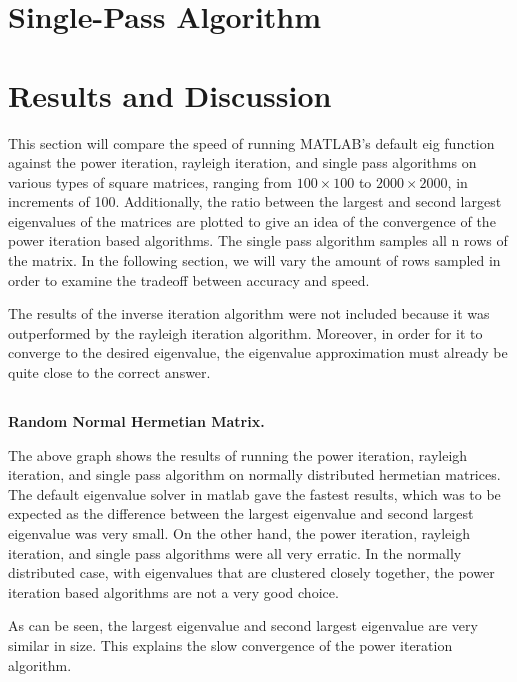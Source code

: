 \documentclass[11pt]{amsart}
\begin{document}
\section{Single-Pass Algorithm}
\section{Results and Discussion}

This section will compare the speed of running MATLAB's default eig function against the power iteration, rayleigh iteration, and single pass algorithms on various types of square matrices, ranging from $100 \times 100$ to $ 2000 \times 2000$, in increments of 100. Additionally, the ratio between the largest and second largest eigenvalues of the matrices are plotted to give an idea of the convergence of the power iteration based algorithms. The single pass algorithm samples all n rows of the matrix. In the following section, we will vary the amount of rows sampled in order to examine the tradeoff between accuracy and speed. 

The results of the inverse iteration algorithm were not included because it was outperformed by the rayleigh iteration algorithm. Moreover, in order for it to converge to the desired eigenvalue, the eigenvalue approximation must already be quite close to the correct answer.

\subsection{} \textbf{Random Normal Hermetian Matrix.}


The above graph shows the results of running the power iteration, rayleigh iteration, and single pass algorithm on normally distributed hermetian matrices. The default eigenvalue solver in matlab gave the fastest results, which was to be expected as the difference between the largest eigenvalue and second largest eigenvalue was very small. On the other hand, the power iteration, rayleigh iteration, and single pass algorithms were all very erratic. In the normally distributed case, with eigenvalues that are clustered closely together, the power iteration based algorithms are not a very good choice.


As can be seen, the largest eigenvalue and second largest eigenvalue are very similar in size. This explains the slow convergence of the power iteration algorithm.
\end{document}
